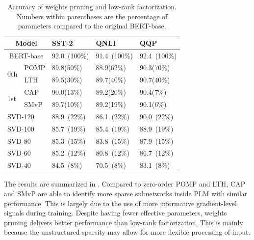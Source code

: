 \begin{table}[h]
	\centering
	\scriptsize
	\begin{tabular}{l|l|lll}
		\toprule
		\multicolumn{2}{c|}{Model}                          & SST-2       & QNLI          & QQP           \\
		\midrule
		\multicolumn{2}{c|}{BERT-base}                           & 92.0~(100\%)        & 91.4~(100\%)          & 92.4~(100\%)          \\
		\midrule
		\multirow{2}{*}{0th}                      & POMP & 89.8(50\%) & 88.9(62\%) & 90.3(70\%) \\
		& LTH  & 89.5(30\%) & 89.7(40\%)   & 90.7(40\%)   \\
		\midrule
		\multirow{2}{*}{1st} & CAP  & 90.0(13\%) & 89.2(20\%)   & 90.4(7\%)   \\
		& SMvP & 89.7(10\%) & 89.2(19\%)   & 90.1(6\%)  \\
		\midrule
		\multicolumn{2}{l|}{SVD-120} & 88.9~(22\%)      &86.1~(22\%)      & 90.0~(22\%)       \\
		\multicolumn{2}{l|}{SVD-100}  & 85.7~(19\%)      & 85.4~(19\%)     & 88.9~(19\%)       \\
		\multicolumn{2}{l|}{SVD-80}  &85.3~(15\%)       & 83.8~(15\%)     &87.9~(15\%)        \\
		\multicolumn{2}{l|}{SVD-60}  & 85.2~(12\%)      &  80.8~(12\%)    & 86.7~(12\%)       \\
		\multicolumn{2}{l|}{SVD-40}  &  84.5~(8\%)     &  70.5~(8\%)    &  83.1~(8\%)      \\
		\bottomrule
	\end{tabular}
	\caption{Accuracy of weights pruning and low-rank 
factorization.
Numbers within parentheses are the percentage of parameters compared to the original BERT-base.}
	\label{table:pilot}
\end{table}
The results are summarized in . Compared to zero-order POMP and LTH, CAP and SMvP are able to identify more sparse subnetworks inside PLM with similar performance. This is largely due to the use of more informative gradient-level signals during training. Despite having fewer effective parameters, weights pruning delivers better performance than low-rank factorization. This is mainly because the unstructured sparsity may allow for more flexible processing of input.

